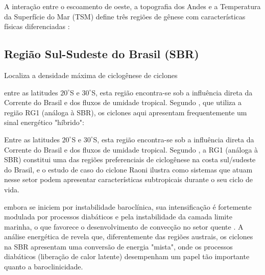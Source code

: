 A interação entre o escoamento de oeste, a topografia dos Andes e a Temperatura da Superfície do Mar (TSM) define três regiões de gênese com características físicas diferenciadas \citep{gramcianinov2019properties}:

\subsection{Região Sul-Sudeste do Brasil (SBR)}\label{subsec:mt_sbr}
Localiza a densidade máxima de ciclogênese de ciclones

entre as latitudes $20^\circ$S e $30^\circ$S, esta região encontra-se sob a influência direta da Corrente do Brasil e dos fluxos de umidade tropical. Segundo \citet{reboita2022from}, que utiliza a região RG1 (análoga à SBR), os ciclones aqui apresentam frequentemente um sinal energético "híbrido": 

Entre as latitudes $20^\circ$S e $30^\circ$S, esta região encontra-se sob a influência direta da Corrente do Brasil e dos fluxos de umidade tropical. Segundo \citet{reboita2022from}, a RG1 (análoga à SBR) constitui uma das regiões preferenciais de ciclogênese na costa sul/sudeste do Brasil, e o estudo de caso do ciclone Raoni ilustra como sistemas que atuam nesse setor podem apresentar características subtropicais durante o seu ciclo de vida.


embora se iniciem por instabilidade baroclínica, sua intensificação é fortemente modulada por processos diabáticos e pela instabilidade da camada limite marinha, o que favorece o desenvolvimento de convecção no setor quente \citep{marrafon2022classificacao}. A análise energética de \citet{coutodesouza2024thesis} revela que, diferentemente das regiões austrais, os ciclones na SBR apresentam uma conversão de energia "mista", onde os processos diabáticos (liberação de calor latente) desempenham um papel tão importante quanto a baroclinicidade.

